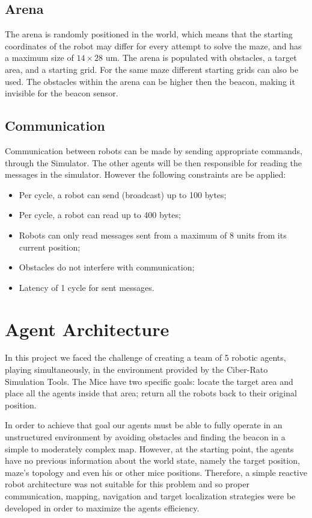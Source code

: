 \documentclass[oribibl]{llncs}
\begin{document}
\subsection{Arena}
The arena is randomly positioned in the world, which means that the starting coordinates of the robot may differ for every attempt to solve the maze, and has a maximum size of $14\times28$ um.
The arena is populated with obstacles, a target area, and a starting grid. For the same maze different starting grids can also be used. The obstacles within the arena can be higher then the beacon, making it invisible for the beacon sensor.

\subsection{Communication}
Communication between robots can be made by sending appropriate commands, through the Simulator. The other agents will be then responsible for reading the messages in the simulator. However the following constraints are be applied:
\begin{itemize}
 \item Per cycle, a robot can send (broadcast) up to 100 bytes;
 \item Per cycle, a robot can read up to 400 bytes;
 \item Robots can only read messages sent from a maximum of 8 units from its current position;
 \item Obstacles do not interfere with communication;
 \item Latency of 1 cycle for sent messages.
 \end{itemize} 

\section{Agent Architecture}
In this project we faced the challenge of creating a team of 5 robotic agents, playing simultaneously, in the environment provided by the Ciber-Rato Simulation Tools.
The Mice have two specific goals: locate the target area and place all the agents inside that area; return all the robots back to their original position.

In order to achieve that goal our agents must be able to fully operate in an unstructured environment by avoiding obstacles and finding the beacon in a simple to moderately complex map. 
However, at the starting point, the agents have no previous information about the world state, namely the target position, maze's topology and even his or other mice positions. Therefore, a simple reactive robot architecture was not suitable for this problem and so proper communication, mapping, navigation and target localization strategies were be developed in order to maximize the agents efficiency.
\end{document}
